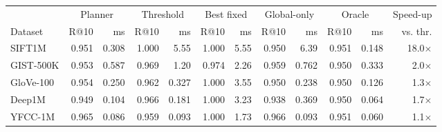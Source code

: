 \begin{tabular}{lrrrrrrrrrrr}
\toprule
 & \multicolumn{2}{c}{Planner} & \multicolumn{2}{c}{Threshold} & \multicolumn{2}{c}{Best fixed} & \multicolumn{2}{c}{Global-only} & \multicolumn{2}{c}{Oracle} & Speed-up \\
\cmidrule(lr){2-3} \cmidrule(lr){4-5} \cmidrule(lr){6-7} \cmidrule(lr){8-9} \cmidrule(lr){10-11}
Dataset & R@10 & ms & R@10 & ms & R@10 & ms & R@10 & ms & R@10 & ms & vs. thr. \\
\midrule
SIFT1M & 0.951 & 0.308 & 1.000 & 5.55 & 1.000 & 5.55 & 0.950 & 6.39 & 0.951 & 0.148 & 18.0$\times$ \\
GIST-500K & 0.953 & 0.587 & 0.969 & 1.20 & 0.974 & 2.26 & 0.959 & 0.762 & 0.950 & 0.333 & 2.0$\times$ \\
GloVe-100 & 0.954 & 0.250 & 0.962 & 0.327 & 1.000 & 3.55 & 0.950 & 0.238 & 0.950 & 0.126 & 1.3$\times$ \\
Deep1M & 0.949 & 0.104 & 0.966 & 0.181 & 1.000 & 3.23 & 0.938 & 0.369 & 0.950 & 0.064 & 1.7$\times$ \\
YFCC-1M & 0.965 & 0.086 & 0.959 & 0.093 & 1.000 & 1.73 & 0.966 & 0.093 & 0.951 & 0.060 & 1.1$\times$ \\
\bottomrule
\end{tabular}
